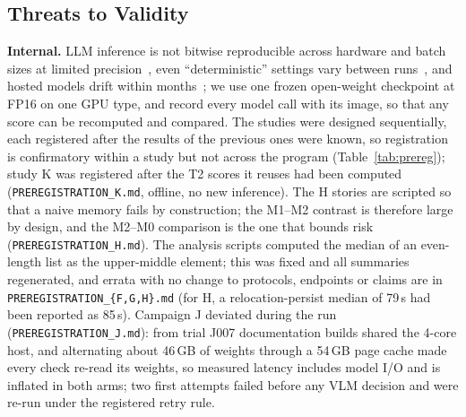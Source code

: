 \documentclass[conference]{IEEEtran}
\begin{document}
\subsection{Threats to Validity}\label{sec:threats}
\textbf{Internal.} LLM inference is not bitwise reproducible across hardware and batch sizes at limited precision~\cite{yuan2025nondeterminism}, even ``deterministic'' settings vary between runs~\cite{atil2024nondeterministic}, and hosted models drift within months~\cite{chen2023chatgptdrift}; we use one frozen open-weight checkpoint at FP16 on one GPU type, and record every model call with its image, so that any score can be recomputed and compared. The studies were designed sequentially, each registered after the results of the previous ones were known, so
registration is confirmatory within a study but not across the program (Table~\ref{tab:prereg}); study K was registered after the T2 scores it
reuses had been computed (\texttt{PREREGISTRATION\_K.md}, offline, no new inference). The H stories are scripted so that a naive memory
fails by construction; the M1--M2 contrast is therefore large by design, and the M2--M0 comparison is the one that bounds risk
(\texttt{PREREGISTRATION\_H.md}). The analysis scripts computed the median of an even-length list as the upper-middle element; this was fixed
and all summaries regenerated, and errata with no change to protocols, endpoints or claims are in \texttt{PREREGISTRATION\_\{F,G,H\}.md}
(for H, a relocation-persist median of 79\,s had been reported as 85\,s). Campaign J deviated during the run (\texttt{PREREGISTRATION\_J.md}): from trial J007
documentation builds shared the 4-core host, and alternating about 46\,GB of weights through a 54\,GB page cache made every check
re-read its weights, so measured latency includes model I/O and is inflated in both arms; two first attempts failed before any VLM decision
and were re-run under the registered retry rule.
\end{document}
